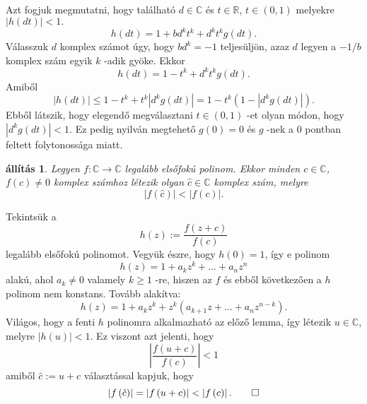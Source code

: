 \documentclass[9pt, a4paper, showtrims]{memoir}
\makeatletter
\renewenvironment{proof}[1][\proofname]
    {\par\pushQED{\qed}%
    \normalfont \topsep6\p@\@plus6\p@\relax
    \trivlist
    \item[\hskip\labelsep
        \itshape
    #1\@addpunct{:}]\ignorespaces}
    {\popQED\endtrivlist\@endpefalse}
\theoremstyle{plain}
\newtheorem{proposition}{állítás}[chapter]
\theoremstyle{remark}
\theoremstyle{definition}
\makeatother
\begin{document}
\begin{proof}
    Azt fogjuk megmutatni, hogy található $d\in \mathbb{C}$ és $t\in 
    \mathbb{R}$, $t\in \left( 0,1\right) $ melyekre $\left| h\left( dt\right)
    \right| <1.$\[
        h\left( dt\right) =1+bd^{k}t^{k}+d^{k}t^{k}g\left( dt\right) .
    \]
    Válasszuk $d$ komplex számot úgy, hogy $bd^{k}=-1$ teljesüljön, azaz $d$ legyen a $-1/b$ komplex szám egyik $k$ -adik gyöke.
    Ekkor 
    \[
        h\left( dt\right) =1-t^{k}+d^{k}t^{k}g\left( dt\right) .
    \]
    Amiből 
    \[
        \left| h\left( dt\right) \right| \leq 1-t^{k}+t^{k}\left| d^{k}g\left(
        dt\right) \right| =1-t^{k}\left( 1-\left| d^{k}g\left( dt\right) \right|
        \right) .
    \]
    Ebből látszik, hogy elegendő megválasztani $t\in \left(
    0,1\right) $ -et olyan módon, hogy $\left| d^{k}g\left( dt\right)
    \right| <1.$ Ez pedig nyilván megtehető $g\left( 0\right) =0$ és 
    $g$ -nek a $0$ pontban feltett folytonossága miatt.
\end{proof}

\begin{proposition}
    \label{Th:Cauchy2}Legyen $f:\mathbb{C}\rightarrow \mathbb{C}$ legalább elsőfokú polinom.
    Ekkor minden $c\in \mathbb{C}$, $f\left( c\right) \neq 0$
    komplex számhoz létezik olyan $\hat{c}\in \mathbb{C}$ komplex szám,
    melyre 
    \[
        \left| f\left( \hat{c}\right) \right| <\left| f\left( c\right) \right| .
    \]
\end{proposition}

\begin{proof}
    Tekintsük a 
    \[
        h\left( z\right) :=\frac{f\left( z+c\right) }{f\left( c\right) }
    \]
    legalább elsőfokú polinomot.
    Vegyük észre, hogy $h\left(
    0\right) =1$, így e polinom 
    \[
        h\left( z\right) =1+a_{k}z^{k}+\ldots +a_{n}z^{n}
    \]
    alakú, ahol $a_{k}\neq 0$ valamely $k\geq 1$ -re, hiszen az $f$ és
    ebből következően a $h$ polinom nem konstans.
    Tovább alakítva: 
    \[
        h\left( z\right) =1+a_{k}z^{k}+z^{k}\left( a_{k+1}z+\ldots
        +a_{n}z^{n-k}\right) .
    \]
    Világos, hogy a fenti $h$ polinomra alkalmazható az előző
    lemma, így létezik $u\in \mathbb{C}$, melyre $\left| h\left( u\right)
    \right| <1.$ Ez viszont azt jelenti, hogy 
    \[
        \left| \frac{f\left( u+c\right) }{f\left( c\right) }\right| <1
    \]
    amiből $\hat{c}:=u+c$ választással kapjuk, hogy 
    \[
        \left| f\left( \hat{c}\right) \right| =\left| f\left( u+c\right) \right|
        <\left| f\left( c\right) \right| .\qedhere
    \]
\end{proof}
\end{document}

